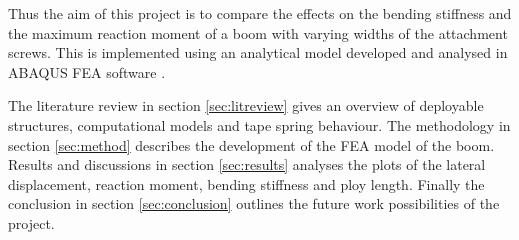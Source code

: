 Thus the aim of this project is to compare the effects on the bending stiffness and the maximum reaction moment of a boom with varying widths of the attachment screws. This is implemented using an analytical model developed and analysed in ABAQUS FEA software \cite{ABAQUS}.     

The literature review in section \ref{sec:litreview} gives an overview of deployable structures, computational models and tape spring behaviour. The methodology in section \ref{sec:method} describes the development of the FEA model of the boom. Results and discussions in section \ref{sec:results} analyses the plots of the lateral displacement, reaction moment, bending stiffness and ploy length. Finally the conclusion in section \ref{sec:conclusion} outlines the future work possibilities of the project. 

\newpage